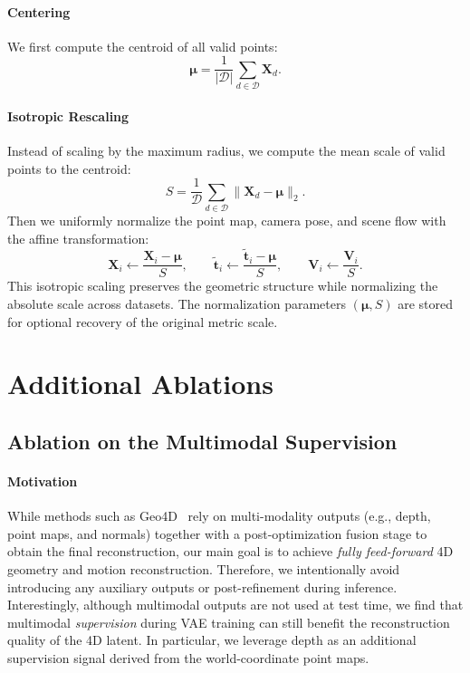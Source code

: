 \paragraph{Centering}
We first compute the centroid of all valid points:
\begin{equation}
\bm{\mu} = \frac{1}{| \mathcal{D}|} \sum_{d \in \mathcal{D}} \bm{X}_d.
\end{equation}

\paragraph{Isotropic Rescaling}
Instead of scaling by the maximum radius, we compute the mean scale of valid points to the centroid:
\begin{equation}
S = \frac{1}{\mathcal{D}} \sum_{d \in \mathcal{D}} \lVert \bm{X}_d -\bm{\mu} \rVert_2.
\end{equation}
Then we uniformly normalize the point map, camera pose, and scene flow with the affine transformation:
\begin{equation}
\bm{X}_i \leftarrow \frac{\bm{X}_i - \bm{\mu}}{S}, \qquad
\tilde{\bm{t}}_i \leftarrow \frac{\tilde{\bm{t}}_i - \bm{\mu}}{S}, \qquad
\bm{V}_i \leftarrow \frac{\bm{V}_i}{S}.
\end{equation}
This isotropic scaling preserves the geometric structure while normalizing the absolute scale across datasets.
The normalization parameters $(\bm{\mu}, S)$ are stored for optional recovery of the original metric scale.


\section{Additional Ablations}
\label{sec:more_ablations}
% 




\subsection{Ablation on the Multimodal Supervision}

\paragraph{Motivation}
While methods such as Geo4D~\cite{jiang2025geo4d} rely on multi-modality outputs 
(e.g., depth, point maps, and normals) together with a post-optimization fusion stage 
to obtain the final reconstruction,
our main goal is to achieve 
\emph{fully feed-forward} 4D geometry and motion reconstruction.
Therefore, we intentionally avoid introducing any auxiliary outputs or post-refinement during inference.
% 
Interestingly, although multimodal outputs are not used at test time,
we find that multimodal \emph{supervision} during VAE training can still benefit the reconstruction quality of the 4D latent.
In particular, we leverage depth as an additional supervision signal derived from the world-coordinate point maps.

